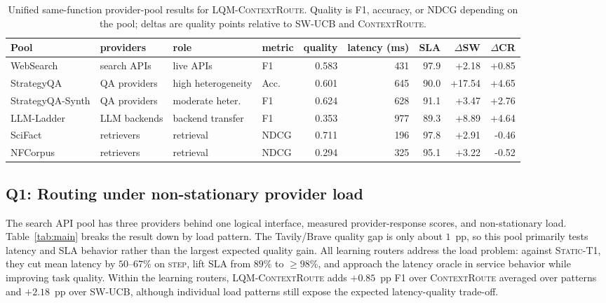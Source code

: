 \documentclass[11pt]{article}
\newcommand{\contextroute}{\textsc{ContextRoute}}
\newcommand{\swucb}{\textsc{SW-UCB}}
\newcommand{\lqmcr}{\textsc{LQM-ContextRoute}}
\begin{document}
\begin{table}[t]
\centering\scriptsize
\setlength{\tabcolsep}{3pt}
\begin{tabular}{ll l l rrr rr}
\toprule
Pool & providers & role & metric & quality & latency (ms) & SLA
& $\Delta$SW & $\Delta$CR \\
\midrule
WebSearch & search APIs & live APIs & F1
& 0.583 & 431 & 97.9 & +2.18 & +0.85 \\
StrategyQA & QA providers & high heterogeneity & Acc.
& 0.601 & 645 & 90.0 & +17.54 & +4.65 \\
StrategyQA-Synth & QA providers & moderate heter. & F1
& 0.624 & 628 & 91.1 & +3.47 & +2.76 \\
LLM-Ladder & LLM backends & backend transfer & F1
& 0.353 & 977 & 89.3 & +8.89 & +4.64 \\
SciFact & retrievers & retrieval & NDCG
& 0.711 & 196 & 97.8 & +2.91 & -0.46 \\
NFCorpus & retrievers & retrieval & NDCG
& 0.294 & 325 & 95.1 & +3.22 & -0.52 \\
\bottomrule
\end{tabular}
\caption{Unified same-function provider-pool results for \lqmcr{}. Quality is
F1, accuracy, or NDCG depending on the pool; deltas are quality points relative
to SW-UCB and \contextroute{}.}
\label{tab:unified-matrix}
\end{table}

\subsection{Q1: Routing under non-stationary provider load}
\label{sec:eval-main}

The search API pool has three providers behind one logical interface, measured provider-response scores, and non-stationary load. Table~\ref{tab:main} breaks the result down by load pattern. The Tavily/Brave quality gap is only about $1$~pp, so this pool primarily tests latency and SLA behavior rather than the largest expected quality gain. All learning routers address the load problem: against \textsc{Static-T1}, they cut mean latency by $50$--$67\%$ on \textsc{step}, lift SLA from $89\%$ to $\geq 98\%$, and approach the latency oracle in service behavior while improving task quality. Within the learning routers, \lqmcr{} adds $+0.85$~pp F1 over \contextroute{} averaged over patterns and $+2.18$~pp over \swucb{}, although individual load patterns still expose the expected latency-quality trade-off.
\end{document}
